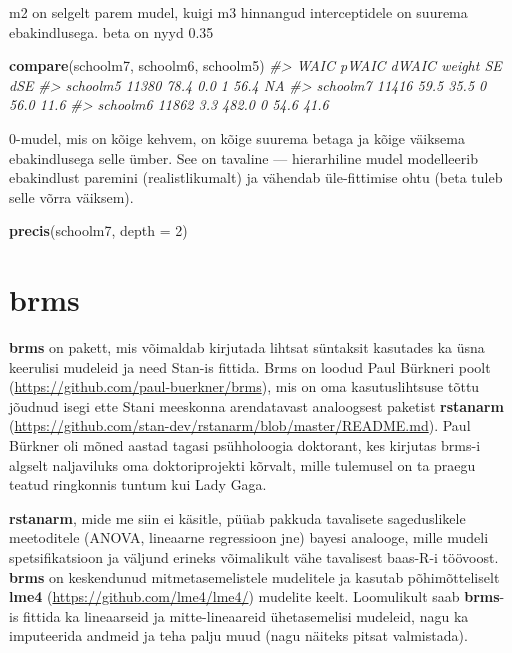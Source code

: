 \documentclass[]{book}
\newenvironment{Shaded}{\begin{snugshade}}{\end{snugshade}}
\newcommand{\KeywordTok}[1]{\textcolor[rgb]{0.13,0.29,0.53}{\textbf{#1}}}
\newcommand{\DataTypeTok}[1]{\textcolor[rgb]{0.13,0.29,0.53}{#1}}
\newcommand{\DecValTok}[1]{\textcolor[rgb]{0.00,0.00,0.81}{#1}}
\newcommand{\CommentTok}[1]{\textcolor[rgb]{0.56,0.35,0.01}{\textit{#1}}}
\newcommand{\NormalTok}[1]{#1}
\begin{document}
m2 on selgelt parem mudel, kuigi m3 hinnangud interceptidele on suurema
ebakindlusega. beta on nyyd 0.35

\begin{Shaded}
\begin{Highlighting}[]
\KeywordTok{compare}\NormalTok{(schoolm7, schoolm6, schoolm5)}
\CommentTok{#>           WAIC pWAIC dWAIC weight   SE  dSE}
\CommentTok{#> schoolm5 11380  78.4   0.0      1 56.4   NA}
\CommentTok{#> schoolm7 11416  59.5  35.5      0 56.0 11.6}
\CommentTok{#> schoolm6 11862   3.3 482.0      0 54.6 41.6}
\end{Highlighting}
\end{Shaded}

0-mudel, mis on kõige kehvem, on kõige suurema betaga ja kõige väiksema
ebakindlusega selle ümber. See on tavaline --- hierarhiline mudel
modelleerib ebakindlust paremini (realistlikumalt) ja vähendab
üle-fittimise ohtu (beta tuleb selle võrra väiksem).

\begin{Shaded}
\begin{Highlighting}[]
\KeywordTok{precis}\NormalTok{(schoolm7, }\DataTypeTok{depth =} \DecValTok{2}\NormalTok{)}
\end{Highlighting}
\end{Shaded}

\chapter{brms}\label{brms}

\textbf{brms} on pakett, mis võimaldab kirjutada lihtsat süntaksit
kasutades ka üsna keerulisi mudeleid ja need Stan-is fittida. Brms on
loodud Paul Bürkneri poolt
(\url{https://github.com/paul-buerkner/brms}), mis on oma
kasutuslihtsuse tõttu jõudnud isegi ette Stani meeskonna arendatavast
analoogsest paketist \textbf{rstanarm}
(\url{https://github.com/stan-dev/rstanarm/blob/master/README.md}). Paul
Bürkner oli mõned aastad tagasi psühholoogia doktorant, kes kirjutas
brms-i algselt naljaviluks oma doktoriprojekti kõrvalt, mille tulemusel
on ta praegu teatud ringkonnis tuntum kui Lady Gaga.

\textbf{rstanarm}, mide me siin ei käsitle, püüab pakkuda tavalisete
sageduslikele meetoditele (ANOVA, lineaarne regressioon jne) bayesi
analooge, mille mudeli spetsifikatsioon ja väljund erineks võimalikult
vähe tavalisest baas-R-i töövoost. \textbf{brms} on keskendunud
mitmetasemelistele mudelitele ja kasutab põhimõtteliselt \textbf{lme4}
(\url{https://github.com/lme4/lme4/}) mudelite keelt. Loomulikult saab
\textbf{brms}-is fittida ka lineaarseid ja mitte-lineaareid
ühetasemelisi mudeleid, nagu ka imputeerida andmeid ja teha palju muud
(nagu näiteks pitsat valmistada).
\end{document}
